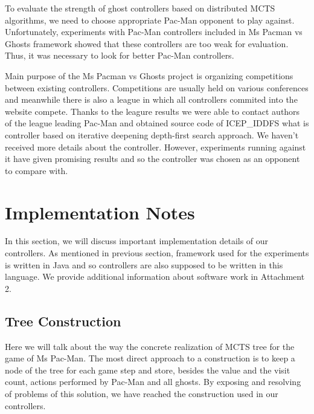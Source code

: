 To evaluate the strength of ghost controllers based on distributed MCTS algorithms, we need to
choose appropriate Pac-Man opponent to play against. Unfortunately, experiments with Pac-Man
controllers included in Ms Pacman vs Ghosts framework showed that these controllers are too
weak for evaluation. Thus, it was necessary to look for better Pac-Man controllers. 

Main purpose of the Ms Pacman vs Ghosts project is organizing competitions between existing
controllers. Competitions are usually held on various conferences and meanwhile there is also a
league  in which all controllers commited into the website compete. Thanks to the leagure
results we were able to contact authors of the league leading Pac-Man and obtained source code
of ICEP\_IDDFS \cite{IcepIddfs} what is controller based on iterative deepening depth-first
search approach. We haven't received more details about the controller. However, experiments
running against it have given promising results and so the controller was chosen as an opponent to
compare with.



\section{Implementation Notes}
\label{sec_implementation_notes}

In this section, we will discuss important implementation details of our controllers. As
mentioned in previous section, framework used for the experiments is written in Java and so
controllers are also supposed to be written in this language. We provide additional information
about software work in Attachment 2.


\subsection{Tree Construction}

Here we will talk about the way the concrete realization of MCTS tree for the game of Ms
Pac-Man. The most direct approach to a construction is to keep a node of the tree for each game
step and store, besides the value and the visit count, actions performed by Pac-Man and all
ghosts. By exposing and resolving of problems of this solution, we have reached the
construction used in our controllers.

